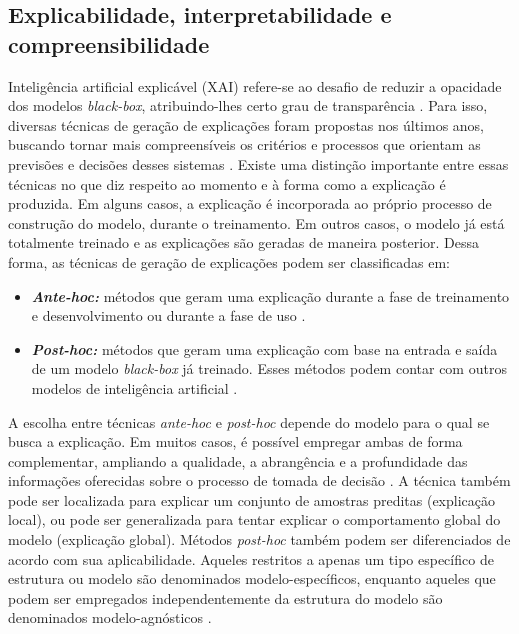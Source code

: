 \subsection{Explicabilidade, interpretabilidade e compreensibilidade}

Inteligência artificial explicável (XAI) refere-se ao desafio de reduzir a opacidade dos modelos \textit{black-box}, atribuindo-lhes certo grau de transparência \citep{Longo2024, ICO2022}. Para isso, diversas técnicas de geração de explicações foram propostas nos últimos anos, buscando tornar mais compreensíveis os critérios e processos que orientam as previsões e decisões desses sistemas \citep{Mersha2024, Guidotti2022, Longo2024, Marino2025}. Existe uma distinção importante entre essas técnicas no que diz respeito ao momento e à forma como a explicação é produzida. Em alguns casos, a explicação é incorporada ao próprio processo de construção do modelo, durante o treinamento. Em outros casos, o modelo já está totalmente treinado e as explicações são geradas de maneira posterior. Dessa forma, as técnicas de geração de explicações podem ser classificadas em:

\begin{itemize}
    \item \textbf{\textit{Ante-hoc:}} métodos que geram uma explicação durante a fase de treinamento e desenvolvimento ou durante a fase de uso \citep{Marino2025}.
    \item \textbf{\textit{Post-hoc:}} métodos que geram uma explicação com base na entrada e saída de um modelo \textit{black-box} já treinado. Esses métodos podem contar com outros modelos de inteligência artificial \citep{Guidotti2022}.
\end{itemize}

A escolha entre técnicas \textit{ante-hoc} e \textit{post-hoc} depende do modelo para o qual se busca a explicação. Em muitos casos, é possível empregar ambas de forma complementar, ampliando a qualidade, a abrangência e a profundidade das informações oferecidas sobre o processo de tomada de decisão \citep{Mersha2024}. A técnica também pode ser localizada para explicar um conjunto de amostras preditas (explicação local), ou pode ser generalizada para tentar explicar o comportamento global do modelo (explicação global). Métodos \textit{post-hoc} também podem ser diferenciados de acordo com sua aplicabilidade. Aqueles restritos a apenas um tipo específico de estrutura ou modelo são denominados modelo-específicos, enquanto aqueles que podem ser empregados independentemente da estrutura do modelo são denominados modelo-agnósticos \citep{Longo2024}.


